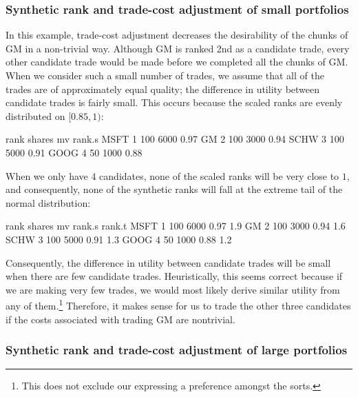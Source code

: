 \documentclass{article}
\begin{document}
\subsubsection{Synthetic rank and trade-cost adjustment of small portfolios}
\label{Synthetic rank and trade-cost adjustment of small portfolios}
In this example, trade-cost adjustment decreases the desirability of
the chunks of GM in a non-trivial way.  Although GM is ranked 2nd as a
candidate trade, every other candidate trade would be made before we
completed all the chunks of GM.  When we consider such a small number
of trades, we assume that all of the trades are of approximately equal
quality; the  difference in utility between candidate trades
is fairly small.  This occurs because the scaled ranks are evenly
distributed on $[0.85,1)$:

\begin{Schunk}
\begin{Soutput}
     rank shares   mv rank.s
MSFT    1    100 6000   0.97
GM      2    100 3000   0.94
SCHW    3    100 5000   0.91
GOOG    4     50 1000   0.88
\end{Soutput}
\end{Schunk}

  When we only have 4 candidates, none of
the scaled ranks will be very close to $1$, and consequently, none of
the synthetic ranks will fall at the extreme tail
of the normal distribution:

\begin{Schunk}
\begin{Soutput}
     rank shares   mv rank.s rank.t
MSFT    1    100 6000   0.97    1.9
GM      2    100 3000   0.94    1.6
SCHW    3    100 5000   0.91    1.3
GOOG    4     50 1000   0.88    1.2
\end{Soutput}
\end{Schunk}

Consequently, the  difference in utility between candidate
trades will be small when there are few candidate trades.
Heuristically, this seems correct because if we are making very few
trades, we would most likely derive similar utility from any of
them.\protect\footnote{This does not exclude our expressing a
preference amongst the sorts.}  Therefore, it makes sense for us to
trade the other three candidates if the costs associated with trading
GM are non\-trivial.

\subsubsection{Synthetic rank and trade-cost adjustment of large portfolios}
\label{Synthetic rank and trade-cost adjustment of large portfolios}
\end{document}
